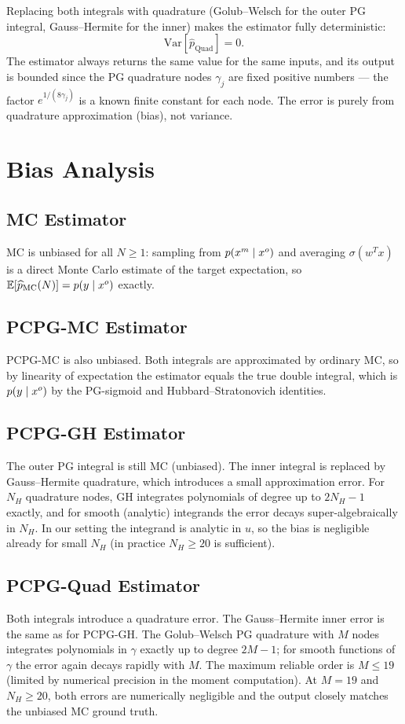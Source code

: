 Replacing both integrals with quadrature (Golub--Welsch for the outer PG
integral, Gauss--Hermite for the inner) makes the estimator fully deterministic:
\[
  \mathrm{Var}\!\left[\widehat{p}_{\mathrm{Quad}}\right] = 0.
\]
The estimator always returns the same value for the same inputs, and its
output is bounded since the PG quadrature nodes $\gamma_j$ are fixed
positive numbers --- the factor $e^{1/(8\gamma_j)}$ is a known finite
constant for each node.
The error is purely from quadrature approximation (bias), not variance.

\section{Bias Analysis}

\subsection{MC Estimator}
MC is unbiased for all $N \geq 1$: sampling from $p(x^m \mid x^o)$ and
averaging $\sigma(w^T x)$ is a direct Monte Carlo estimate of the target
expectation, so $\mathbb{E}[\widehat{p}_{\mathrm{MC}}(N)] = p(y \mid x^o)$ exactly.

\subsection{PCPG-MC Estimator}
PCPG-MC is also unbiased. Both integrals are approximated by ordinary MC,
so by linearity of expectation the estimator equals the true double integral,
which is $p(y \mid x^o)$ by the PG-sigmoid and Hubbard--Stratonovich
identities.

\subsection{PCPG-GH Estimator}
The outer PG integral is still MC (unbiased). The inner integral is replaced
by Gauss--Hermite quadrature, which introduces a small approximation error.
For $N_H$ quadrature nodes, GH integrates polynomials of degree up to $2N_H - 1$
exactly, and for smooth (analytic) integrands the error decays
super-algebraically in $N_H$. In our setting the integrand is analytic in $u$,
so the bias is negligible already for small $N_H$ (in practice $N_H \geq 20$
is sufficient).

\subsection{PCPG-Quad Estimator}
Both integrals introduce a quadrature error. The Gauss--Hermite inner error
is the same as for PCPG-GH. The Golub--Welsch PG quadrature with $M$ nodes
integrates polynomials in $\gamma$ exactly up to degree $2M-1$; for smooth
functions of $\gamma$ the error again decays rapidly with $M$. The maximum
reliable order is $M \leq 19$ (limited by numerical precision in the moment
computation). At $M = 19$ and $N_H \geq 20$, both errors are numerically
negligible and the output closely matches the unbiased MC ground truth.

